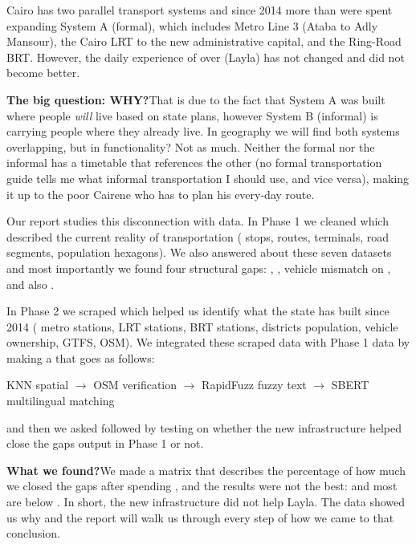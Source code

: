 Cairo has two parallel transport systems and since 2014 more than
 were spent expanding System A (formal), which
includes Metro Line 3 (Ataba to Adly Mansour), the Cairo LRT to the
new administrative capital, and the Ring-Road BRT. However, the daily
experience of over  (Layla) has not changed
and did not become better.

\begin{callout}
\textbf{\color{plotblue}The big question: WHY?}\quad That is due to
the fact that System A was built where people \emph{will} live based
on state plans, however System B (informal) is carrying people where
they already live. In geography we will find both systems
overlapping, but in functionality? Not as much. Neither the formal
nor the informal has a timetable that references the other (no
formal transportation guide tells me what informal transportation I
should use, and vice versa), making it up to the poor Cairene who
has to plan his every-day route.
\end{callout}

Our report studies this disconnection with data. In Phase 1 we cleaned
 which described the current reality of
transportation ( stops,  routes, 
terminals,  road segments,  population
hexagons). We also answered  about these
seven datasets and most importantly we found four structural gaps:
, , vehicle
mismatch on , and also .

In Phase 2 we scraped  which helped us
identify what the state has built since 2014 ( metro
stations,  LRT stations,  BRT stations, 
districts population, vehicle ownership, GTFS, OSM). We integrated
these scraped data with Phase 1 data by making a  that goes as follows:

\begin{center}
KNN spatial $\to$ OSM verification $\to$ RapidFuzz fuzzy text
$\to$ SBERT multilingual matching
\end{center}

and then we asked  followed by testing
 on whether the new infrastructure helped close
the gaps output in Phase 1 or not.

\begin{callout}
\textbf{\color{plotblue}What we found?}\quad We made a
 matrix that describes the percentage of how much we
closed the gaps after spending , and the results were
not the best:  and
most are below . In short, the new infrastructure did not
help Layla. The data showed us why and the report will walk us
through every step of how we came to that conclusion.
\end{callout}

